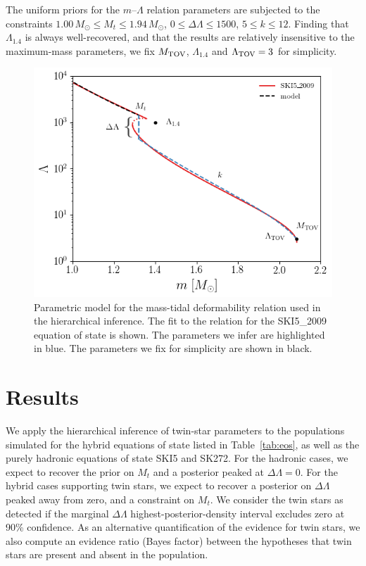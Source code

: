 \documentclass[aps,prd,twocolumn,superscriptaddress,nofootinbib]{revtex4-1}
\newcommand{\Msun}{\ensuremath{\,M_{\odot}}}
\begin{document}
The uniform priors for the $m$--$\Lambda$ relation parameters are subjected to the constraints $1.00\Msun \leq M_{t} \leq 1.94\Msun$, $0 \leq \Delta\Lambda \leq 1500$, $5 \leq k \leq 12$. Finding that $\Lambda_{1.4}$ is always well-recovered, and that the results are relatively insensitive to the maximum-mass parameters, we fix $M_{\rm TOV}$, $\Lambda_{1.4}$ and $\Lambda_{\rm TOV} = 3$ for simplicity.

\begin{figure}[h]
    \centering
    \includegraphics[width=0.95\columnwidth]{SKI52009_fit.png}
    \caption{Parametric model for the mass-tidal deformability relation used in the hierarchical inference. The fit to the relation for the SKI5\_2009 equation of state is shown. The parameters we infer are highlighted in blue. The parameters we fix for simplicity are shown in black.}
    \label{fig:diagram}
\end{figure}

\section{Results}\label{Sec_res}

We apply the hierarchical inference of twin-star parameters to the populations simulated for the hybrid equations of state listed in Table~\ref{tab:eos}, as well as the purely hadronic equations of state SKI5 and SK272. For the hadronic cases, we expect to recover the prior on $M_{t}$ and a posterior peaked at $\Delta\Lambda = 0$. For the hybrid cases supporting twin stars, we expect to recover a posterior on $\Delta\Lambda$ peaked away from zero, and a constraint on $M_{t}$. We consider the twin stars as detected if the marginal $\Delta\Lambda$ highest-posterior-density interval excludes zero at 90\% confidence. As an alternative quantification of the evidence for twin stars, we also compute an evidence ratio (Bayes factor) between the hypotheses that twin stars are present and absent in the population.
\end{document}
